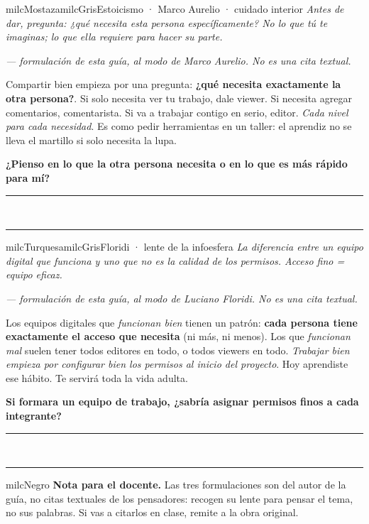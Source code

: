 \documentclass[11pt,letterpaper]{article}
\newcommand{\linead}[1]{\noindent\color{milcLinea}\rule{#1}{0.5pt}\color{milcNegro}}
\begin{document}
\begin{softbox}{milcMostaza}{milcGris}{Estoicismo · Marco Aurelio · cuidado interior}
\textit{Antes de dar, pregunta: ¿qué necesita esta persona específicamente? No lo que tú te imaginas; lo que ella requiere para hacer su parte.}

{\footnotesize\itshape\color{milcNegro!70}--- formulación de esta guía, al modo de Marco Aurelio. No es una cita textual.}

Compartir bien empieza por una pregunta: \textbf{¿qué necesita exactamente la otra persona?}. Si solo necesita ver tu trabajo, dale viewer. Si necesita agregar comentarios, comentarista. Si va a trabajar contigo en serio, editor. \emph{Cada nivel para cada necesidad}. Es como pedir herramientas en un taller: el aprendiz no se lleva el martillo si solo necesita la lupa.

\textbf{¿Pienso en lo que la otra persona necesita o en lo que es más rápido para mí?}
\end{softbox}
\linead{\linewidth}\\[1mm]
\linead{\linewidth}

\begin{softbox}{milcTurquesa}{milcGris}{Floridi · lente de la infoesfera}
\textit{La diferencia entre un equipo digital que funciona y uno que no es la calidad de los permisos. Acceso fino = equipo eficaz.}

{\footnotesize\itshape\color{milcNegro!70}--- formulación de esta guía, al modo de Luciano Floridi. No es una cita textual.}

Los equipos digitales que \emph{funcionan bien} tienen un patrón: \textbf{cada persona tiene exactamente el acceso que necesita} (ni más, ni menos). Los que \emph{funcionan mal} suelen tener todos editores en todo, o todos viewers en todo. \emph{Trabajar bien empieza por configurar bien los permisos al inicio del proyecto}. Hoy aprendiste ese hábito. Te servirá toda la vida adulta.

\textbf{Si formara un equipo de trabajo, ¿sabría asignar permisos finos a cada integrante?}
\end{softbox}
\linead{\linewidth}\\[1mm]
\linead{\linewidth}

\begin{infoband}{milcNegro}
\textbf{Nota para el docente.} Las tres formulaciones son del autor de la guía, no citas textuales de los pensadores: recogen su lente para pensar el tema, no sus palabras. Si vas a citarlos en clase, remite a la obra original.
\end{infoband}
\end{document}
